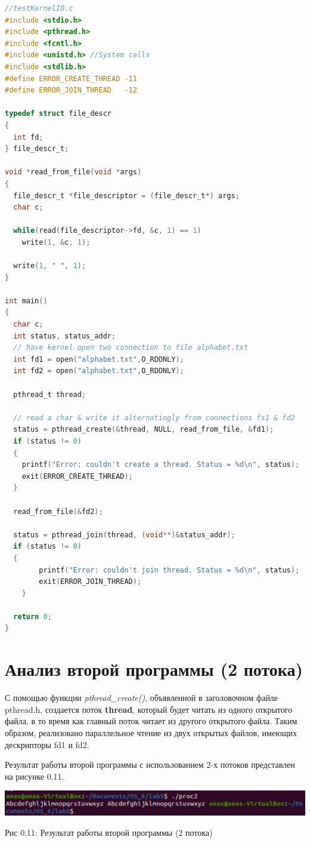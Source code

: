 \documentclass[12pt]{report}
\begin{document}
\begin{lstlisting}[language=C]
//testKernelIO.c
#include <stdio.h>
#include <pthread.h>
#include <fcntl.h>
#include <unistd.h> //System calls
#include <stdlib.h>
#define ERROR_CREATE_THREAD -11
#define ERROR_JOIN_THREAD   -12

typedef struct file_descr
{
  int fd;
} file_descr_t;

void *read_from_file(void *args)
{
  file_descr_t *file_descriptor = (file_descr_t*) args;
  char c;

  while(read(file_descriptor->fd, &c, 1) == 1)
    write(1, &c, 1);
  
  write(1, " ", 1);
}

int main()
{
  char c;
  int status, status_addr;
  // have kernel open two connection to file alphabet.txt
  int fd1 = open("alphabet.txt",O_RDONLY);
  int fd2 = open("alphabet.txt",O_RDONLY);

  pthread_t thread;
 
  // read a char & write it alternatingly from connections fs1 & fd2
  status = pthread_create(&thread, NULL, read_from_file, &fd1);
  if (status != 0)
  { 
    printf("Error: couldn't create a thread. Status = %d\n", status);
    exit(ERROR_CREATE_THREAD);
  }

  read_from_file(&fd2);
   
  status = pthread_join(thread, (void**)&status_addr);
  if (status != 0) 
  {
        printf("Error: couldn't join thread. Status = %d\n", status);
        exit(ERROR_JOIN_THREAD);
    }
  
  return 0;
}

\end{lstlisting}

\section{Анализ второй программы (2 потока)}

С помощью функции \textit{pthread\_create()}, объявленной в заголовочном файле pthread.h, создается поток \textbf{thread}, который будет читать из одного открытого файла, в то время как главный поток читает из другого открытого файла. Таким образом, реализовано параллельное чтение из двух открытых файлов, имеющих дескрипторы fd1 и fd2.

Результат работы второй программы с использованием 2-х потоков представлен на рисунке 0.11.

\begin{center}
		\includegraphics[scale=0.42]{pics/Res2_threads.png}
		
			Рис 0.11: Результат работы второй программы (2 потока)
\end{center}
\end{document}
